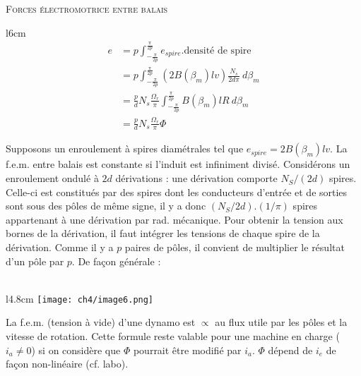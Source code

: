 		\textsc{Forces électromotrice entre balais}\ \\
		\begin{wrapfigure}[12]{l}{6cm}
		\vspace{-2mm}
		\begin{equation}
		\begin{array}{ll}
		e &= \displaystyle p \int_{-\frac{\pi}{2p}}^{\frac{\pi}{2p}} 
		e_{spire}.\text{densité de spire}\\
		&= \displaystyle p \int_{-\frac{\pi}{2p}}^{\frac{\pi}{2p}} (
		2B(\beta_m)lv)\frac{N_s}{2d\pi}\ d\beta_m\\
		&= \displaystyle \frac{p}{d}N_s\frac{\Omega_r}{\pi} \int_{-
		\frac{\pi}{2p}}^{\frac{\pi}{2p}}B(\beta_m)lR\ d\beta_m\\
		&= \displaystyle\frac{p}{d}N_s\frac{\Omega_r}{\pi}\Phi
		\end{array}
		\end{equation}

		\end{wrapfigure}
		Supposons un enroulement à spires diamétrales tel que $e_{spire} = 
		2B(\beta_m)lv$. La f.e.m. entre balais est constante si l'induit 
		est infiniment divisé. Considérons un enroulement ondulé à $2d$ 
		dérivations : une dérivation comporte $N_S/(2d)$ spires. Celle-ci 
		est constitués par des spires dont les conducteurs d'entrée et 
		de sorties sont sous des pôles de même signe, il y a donc 
		$(N_S/2d).(1/\pi)$ spires appartenant à une dérivation par rad. 
		mécanique. Pour obtenir la tension aux bornes de la dérivation, 
		il faut intégrer les tensions de chaque spire de la dérivation. 
		Comme il y a $p$ paires de pôles, il convient de multiplier le 
		résultat d'un pôle par $p$. De façon générale :\\
		
		\ \\

		\begin{wrapfigure}[12]{l}{4.8cm}
		\texttt{[image: ch4/image6.png]}
		\end{wrapfigure}
		La f.e.m. (tension à vide) d'une dynamo est $\propto$ au flux 
		utile par les pôles et la vitesse de rotation. Cette formule 
		reste valable pour une machine en charge ($i_a\neq0$) si on 
		considère que $\Phi$ pourrait être modifié par $i_a$. $\Phi$ 
		dépend de $i_e$ de façon non-linéaire (cf. labo).\\
		
